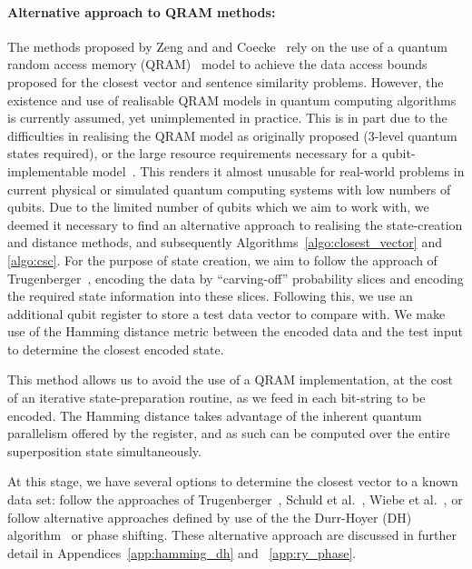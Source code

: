 \paragraph{Alternative approach to QRAM methods:}\label{par:qram_alt_approach} The methods proposed by Zeng and and Coecke~\cite{Zeng_Coecke_2016} rely on the use of a quantum random access memory (QRAM)~\cite{Giovannetti_Lloyd_Maccone_2008} model to achieve the data access bounds proposed for the closest vector and sentence similarity problems. However, the existence and use of realisable QRAM models in quantum computing algorithms is currently assumed, yet unimplemented in practice. This is in part due to the difficulties in realising the QRAM model as originally proposed (3-level quantum states required), or the large resource requirements necessary for a qubit-implementable model~\cite{Arunachalam_Gheorghiu_Jochym-OConnor_Mosca_Srinivasan_2015}. This renders it almost unusable for real-world problems in current physical or simulated quantum computing systems with low numbers of qubits. Due to the limited number of qubits which we aim to work with, we deemed it necessary to find an alternative approach to realising the state-creation and distance methods, and subsequently Algorithms~\ref{algo:closest_vector} and \ref{algo:csc}. For the purpose of state creation, we aim to follow the approach of Trugenberger~\cite{Trugenberger_2001,Trugenberger_2002}, encoding the data by ``carving-off'' probability slices and encoding the required state information into these slices. Following this, we use an additional qubit register to store a test data vector to compare with. We make use of the Hamming distance metric between the encoded data and the test input to determine the closest encoded state.

This method allows us to avoid the use of a QRAM implementation, at the cost of an iterative state-preparation routine, as we feed in each bit-string to be encoded. The Hamming distance takes advantage of the inherent quantum parallelism offered by the register, and as such can be computed over the entire superposition state simultaneously. 

At this stage, we have several options to determine the closest vector to a known data set: follow the approaches of Trugenberger~\cite{Trugenberger_2001,Trugenberger_2002}, Schuld et al.~\cite{Schuld_Sinayskiy_Petruccione_2014}, Wiebe et al.~\cite{Wiebe_Kapoor_Svore_2014}, or follow alternative approaches defined by use of the the Durr-Hoyer (DH) algorithm~\cite{Durr_Hoyer_1996} or phase shifting. These alternative approach are discussed in further detail in Appendices~\ref{app:hamming_dh} and ~\ref{app:ry_phase}.

